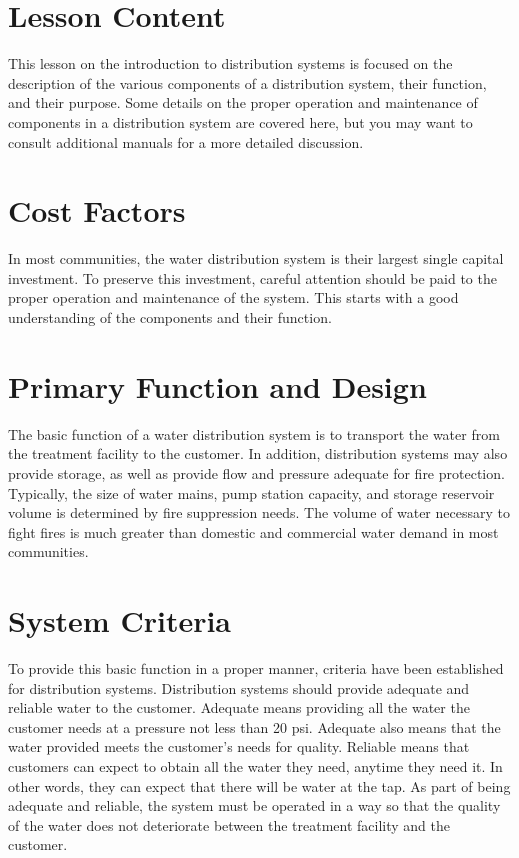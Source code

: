 \documentclass[10pt]{article}
\begin{document}
\section{Lesson Content}
This lesson on the introduction to distribution systems is focused on the description of the various components of a distribution system, their function, and their purpose. Some details on the proper operation and maintenance of components in a distribution system are covered here, but you may want to consult additional manuals for a more detailed discussion.

\section{Cost Factors}
In most communities, the water distribution system is their largest single capital investment. To preserve this investment, careful attention should be paid to the proper operation and maintenance of the system. This starts with a good understanding of the components and their function.

\section{Primary Function and Design}
The basic function of a water distribution system is to transport the water from the treatment facility to the customer. In addition, distribution systems may also provide storage, as well as provide flow and pressure adequate for fire protection. Typically, the size of water mains, pump station capacity, and storage reservoir volume is determined by fire suppression needs. The volume of water necessary to fight fires is much greater than domestic and commercial water demand in most communities.

\section{System Criteria}
To provide this basic function in a proper manner, criteria have been established for distribution systems. Distribution systems should provide adequate and reliable water to the customer. Adequate means providing all the water the customer needs at a pressure not less than 20 psi. Adequate also means that the water provided meets the customer's needs for quality. Reliable means that customers can expect to obtain all the water they need, anytime they need it. In other words, they can expect that there will be water at the tap. As part of being adequate and reliable, the system must be operated in a way so that the quality of the water does not deteriorate between the treatment facility and the customer.
\end{document}
